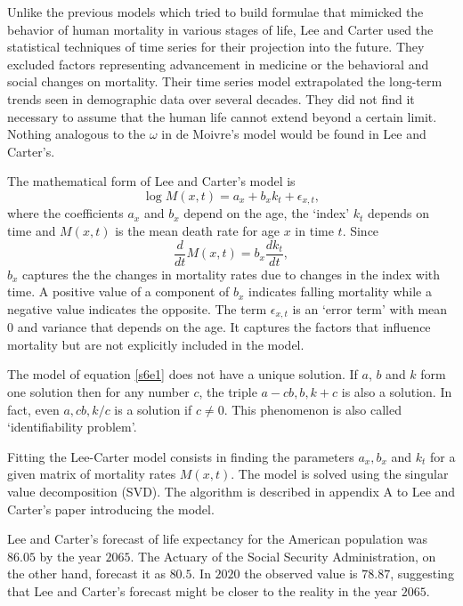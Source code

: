 \documentclass{article}
\numberwithin{equation}{section}
\begin{document}
Unlike the previous models which tried to build formulae that mimicked the
behavior of human mortality in various stages of life, Lee and Carter used
the statistical techniques of time series for their projection into the future.
They excluded factors representing advancement in medicine or the behavioral
and social changes on mortality. Their time series model extrapolated the 
long-term trends seen in demographic data over several decades. They did not
find it necessary to assume that the human life cannot extend beyond a certain
limit. Nothing analogous to the $\omega$ in de Moivre's model would be found
in Lee and Carter's.

The mathematical form of Lee and Carter's model is
\begin{equation}\label{s6e1}
\log{M}(x, t) = {a}_x + {b}_x{k}_t + \epsilon_{x, t},
\end{equation}
where the coefficients ${a}_x$ and ${b}_x$ depend on the age, the
`index' ${k}_t$ depends on time and ${M}(x, t)$ is the mean death
rate for age $x$ in time $t$. Since
\[
\frac{d}{dt}{M}(x, t) = {b}_x\frac{dk_t}{dt},
\]
${b}_x$ captures the the changes in mortality rates due to changes in
the index with time. A positive value of a component of ${b}_x$ indicates
falling mortality while a negative value indicates the opposite. The term
$\epsilon_{x, t}$ is an `error term' with mean $0$ and variance that depends
on the age. It captures the factors that influence mortality but are not
explicitly included in the model.

The model of equation \eqref{s6e1} does not have a unique solution. If 
${a}$, ${b}$ and ${k}$ form one solution then for any number $c$,
the triple ${a} - c{b}, {b}, {k} + c$ is also a solution. In
fact, even ${a}, c{b}, {k}/c$ is a solution if $c \ne 0$. This phenomenon is
also called `identifiability problem'\cite{plat2009stochastic}.

Fitting the Lee-Carter model consists in finding the parameters ${a}_x,
{b}_x$ and ${k}_t$ for a given matrix of mortality rates ${M}(x, t)$.
The model is solved using the singular value decomposition (SVD). The algorithm
is described in appendix A to Lee and Carter's paper\cite{lee1992modeling} 
introducing the model.

Lee and Carter's forecast of life expectancy for the American population was 
$86.05$ by the year $2065$. The Actuary of the Social Security Administration,
on the other hand, forecast it as $80.5$. In $2020$ the observed value is 
$78.87$, suggesting that Lee and Carter's forecast might be closer to the 
reality in the year $2065$.
\end{document}
